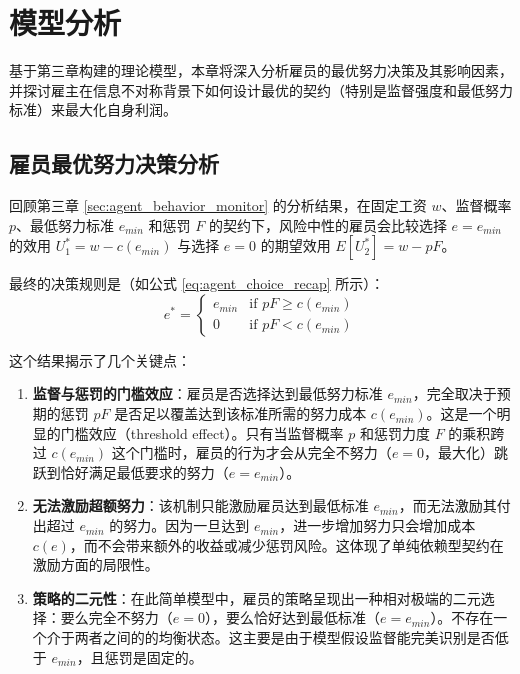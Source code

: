 \chapter{模型分析}
\label{chap:analysis}

基于第三章构建的理论模型，本章将深入分析雇员的最优努力决策及其影响因素，并探讨雇主在信息不对称背景下如何设计最优的契约（特别是监督强度和最低努力标准）来最大化自身利润。

\section{雇员最优努力决策分析}
\label{sec:agent_decision_analysis}

回顾第三章 \ref{sec:agent_behavior_monitor} 的分析结果，在固定工资 $w$、监督概率 $p$、最低努力标准 $e_{min}$ 和惩罚 $F$ 的契约下，风险中性的雇员会比较选择 $e=e_{min}$ 的效用 $U_1^* = w - c(e_{min})$ 与选择 $e=0$ 的期望效用 $E[U_2^*] = w - pF$。

最终的决策规则是（如公式 \ref{eq:agent_choice_recap} 所示）：
\begin{equation} \label{eq:agent_choice_recap}
e^* = \begin{cases} e_{min} & \text{if } pF \ge c(e_{min}) \\ 0 & \text{if } pF < c(e_{min}) \end{cases}
\end{equation}

这个结果揭示了几个关键点：
\begin{enumerate}
    \item \textbf{监督与惩罚的门槛效应}：雇员是否选择达到最低努力标准 $e_{min}$，完全取决于预期的惩罚 $pF$ 是否足以覆盖达到该标准所需的努力成本 $c(e_{min})$。这是一个明显的门槛效应（threshold effect）。只有当监督概率 $p$ 和惩罚力度 $F$ 的乘积跨过 $c(e_{min})$ 这个门槛时，雇员的行为才会从完全不努力（$e=0$，最大化）跳跃到恰好满足最低要求的努力（$e=e_{min}$）。
    \item \textbf{无法激励超额努力}：该机制只能激励雇员达到最低标准 $e_{min}$，而无法激励其付出超过 $e_{min}$ 的努力。因为一旦达到 $e_{min}$，进一步增加努力只会增加成本 $c(e)$，而不会带来额外的收益或减少惩罚风险。这体现了单纯依赖型契约在激励方面的局限性。
    \item \textbf{策略的二元性}：在此简单模型中，雇员的策略呈现出一种相对极端的二元选择：要么完全不努力（$e=0$），要么恰好达到最低标准（$e=e_{min}$）。不存在一个介于两者之间的的均衡状态。这主要是由于模型假设监督能完美识别是否低于 $e_{min}$，且惩罚是固定的。
\end{enumerate}

